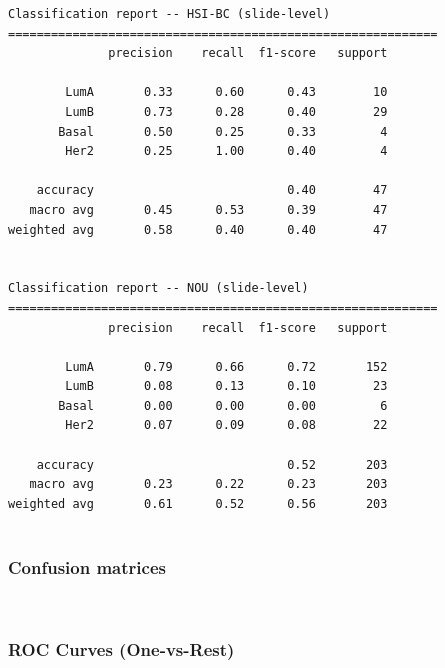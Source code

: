\documentclass[11pt]{article}
\begin{document}
    \begin{Verbatim}[commandchars=\\\{\}]
Classification report -- HSI-BC (slide-level)
============================================================
              precision    recall  f1-score   support

        LumA       0.33      0.60      0.43        10
        LumB       0.73      0.28      0.40        29
       Basal       0.50      0.25      0.33         4
        Her2       0.25      1.00      0.40         4

    accuracy                           0.40        47
   macro avg       0.45      0.53      0.39        47
weighted avg       0.58      0.40      0.40        47


Classification report -- NOU (slide-level)
============================================================
              precision    recall  f1-score   support

        LumA       0.79      0.66      0.72       152
        LumB       0.08      0.13      0.10        23
       Basal       0.00      0.00      0.00         6
        Her2       0.07      0.09      0.08        22

    accuracy                           0.52       203
   macro avg       0.23      0.22      0.23       203
weighted avg       0.61      0.52      0.56       203


    \end{Verbatim}

    \hypertarget{confusion-matrices}{%
\subsubsection{Confusion matrices}\label{confusion-matrices}}

    \begin{center}
    \end{center}
    { \hspace*{\fill} \\}
    
    \hypertarget{roc-curves-one-vs-rest}{%
\subsubsection{ROC Curves (One-vs-Rest)}\label{roc-curves-one-vs-rest}}

    \begin{center}
    \end{center}
    { \hspace*{\fill} \\}
    
\end{document}
